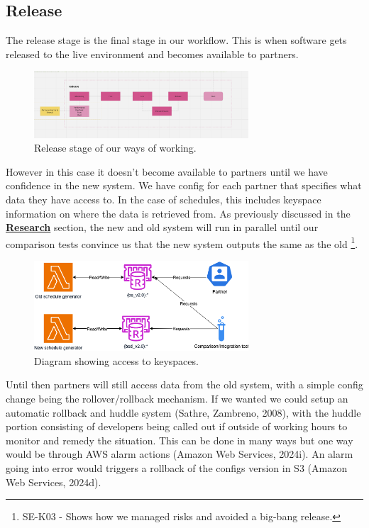 \subsection{Release}
  The release stage is the final stage in our workflow. This is when software gets released to the live environment and becomes available to partners. 
  \begin{figure}[H]
    \centering
    \includegraphics[width=8cm]{assets/workflow/release.png}
    \caption{Release stage of our ways of working.}
    \label{fig:workflowRelease}
  \end{figure}

  However in this case it doesn't become available to partners until we have confidence in the new system. We have config for each partner that 
  specifies what data they have access to. In the case of schedules, this includes keyspace information on where the data is retrieved from. As 
  previously discussed in the \hyperref[sec:cicd]{\textbf{Research}} section, the new and old system will run in parallel until our comparison tests 
  convince us that the new system outputs the same as the old \footnote{SE-K03 - Shows how we managed risks and avoided a big-bang release.}.

  \begin{figure}[H]
    \centering
    \includegraphics[width=8cm]{assets/keyspaceAccess.drawio.png}
    \caption{Diagram showing access to keyspaces.}
    \label{fig:keySpaceAccess}
  \end{figure}

  Until then partners will still access data from the old system, with a simple config change being the rollover/rollback mechanism. If we wanted we 
  could setup an automatic rollback and huddle system (Sathre, Zambreno, 2008), with the huddle portion consisting of developers being called out if 
  outside of working hours to monitor and remedy the situation. This can be done in many ways but one way would be through AWS alarm 
  actions (Amazon Web Services, 2024i). An alarm going into error would  triggers a rollback of the configs version in S3 (Amazon Web Services, 2024d).

